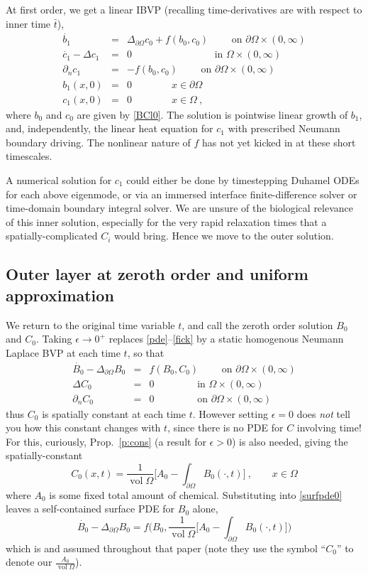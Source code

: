 \documentclass[10pt]{article}
\newcommand{\be}{\begin{equation}}
\newcommand{\ee}{\end{equation}}
\newcommand{\bea}{\begin{eqnarray}}
\newcommand{\eea}{\end{eqnarray}}
\newcommand{\qqquad}{\qquad\qquad}
\newcommand{\qqqquad}{\qqquad\qqquad}
\DeclareMathOperator{\vol}{vol}
\newcommand{\pO}{{\partial\Omega}}
\newcommand{\LpO}{\Delta_\pO}
\newcommand{\eps}{\epsilon}
\newcommand{\dn}{\partial_n}
\begin{document}
At first order, we get a linear IBVP (recalling time-derivatives
are with respect to inner time $\bar{t}$),
\bea
\dot{b_1}  &=& \LpO c_0 + f(b_0,c_0)  \qquad \mbox{ on } \pO \times (0,\infty)
\\
\dot{c_1} - \Delta c_1   &=& 0   \qqqquad \mbox{ in } \Omega \times (0,\infty)
\\
\dn c_1  &=& -f(b_0,c_0) \qquad \mbox{ on } \pO \times (0,\infty)
\\
b_1(x,0) &=& 0  \qqquad x\in\pO
\label{Bi1}
\\
c_1(x,0) &=& 0  \qqquad x\in\Omega ~,
\label{Ci1}
\eea
where $b_0$ and $c_0$ are given by \eqref{BCl0}.
The solution is pointwise linear growth of $b_1$, and, independently,
the linear heat equation for $c_1$ with prescribed
Neumann boundary driving.
The nonlinear nature of $f$ has not yet kicked in at these short timescales.

A numerical solution for $c_1$ could either be done by timestepping
Duhamel ODEs for each above eigenmode, or via an immersed interface finite-difference
solver or time-domain boundary integral solver.
We are unsure of the biological relevance of this inner solution,
especially for the very rapid relaxation times that a spatially-complicated $C_i$ would bring.
Hence we move to the outer solution.



\subsection{Outer layer at zeroth order and uniform approximation}

We return to the original time variable $t$,
and call the zeroth order solution $B_0$ and $C_0$.
Taking $\eps\to 0^+$ replaces \eqref{pde}--\eqref{fick}
by a static homogenous Neumann Laplace BVP at each time $t$,
so that
\bea
\dot{B_0} - \LpO B_0   &=&  f(B_0,C_0)  \qquad \mbox{ on } \pO \times (0,\infty)
\label{surfpde0}
\\
\Delta C_0   &=& 0   \qqquad \mbox{ in } \Omega \times (0,\infty)
\label{pde0}
\\
\dn C_0  &=& 0 \qqquad \mbox{ on } \pO \times (0,\infty)
\label{fick0}
\eea
thus $C_0$ is spatially constant at each time $t$.
However setting $\eps=0$ does {\em not} tell you how this
constant changes with $t$, since there is no PDE for $C$ involving time!
For this, curiously, Prop.~\ref{p:cons} (a result for $\eps>0$) is also needed,
giving the spatially-constant
\be
C_0(x,t) = \frac{1}{\vol\Omega}\biggl[ A_0 - \int_\pO B_0(\cdot,t) \biggr]
~, \qquad x\in\Omega
\label{C0}
\ee
where $A_0$ is some fixed total amount of chemical.
Substituting into \eqref{surfpde0} leaves a self-contained surface
PDE for $B_0$ alone,
\be
\dot{B_0} - \LpO B_0 =f \biggl( B_0 , \frac{1}{\vol\Omega} \biggl[ A_0 - \int_\pO B_0(\cdot,t) \biggr]
\biggr)
\label{B0only}
\ee
which is \cite[Eq.~(7)]{diegmiller18} and assumed throughout that paper
(note they use the symbol ``$C_0$'' to denote our $\frac{A_0}{\vol\Omega}$).
\end{document}

